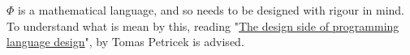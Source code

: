 \documentclass[../../main.tex]{subfiles}
\begin{document}
    $\Phi$ is a mathematical language, and so needs to be designed with rigour in mind.
    To understand what is mean by this, reading "\href{http://tomasp.net/blog/2017/design-side-of-pl/}{The design side of programming language design}", by Tomas Petricek is advised.
\end{document}
